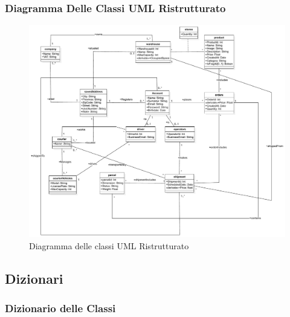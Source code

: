 \newpage

\subsubsection{Diagramma Delle Classi UML Ristrutturato}

\begin{figure}[ht]
  \centering
  \includegraphics[scale=0.55]{imgs/umlRistrutturato.pdf}
  \caption{Diagramma delle classi UML Ristrutturato}
\end{figure}

\newpage

\subsection{Dizionari}

\subsubsection{Dizionario delle Classi}

